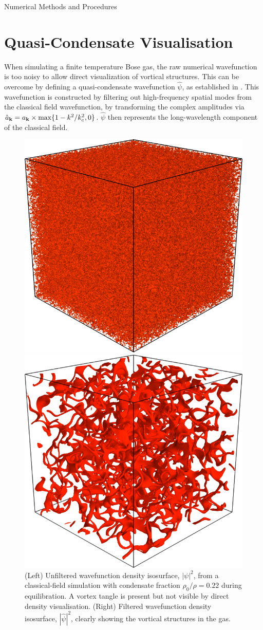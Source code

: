 \begin{chapter}{\label{cha:numerics}Numerical Methods and Procedures}
\section{\label{section:quasi-condensate} Quasi-Condensate Visualisation}
When simulating a finite temperature Bose gas, the raw numerical wavefunction is too noisy to allow direct visualization of vortical structures. This can be overcome by defining a quasi-condensate wavefunction $\hat{\psi}$, as established in \cite{PhysRevA.66.013603}. This wavefunction is constructed by filtering out high-frequency spatial modes from the classical field wavefunction, by 
transforming the complex amplitudes via
$\hat{a}_{{\bf k}} = a_{{\bf k}}\times\max\{1-k^{2}/k_c^2,0\}$. $\hat{\psi}$ then represents the long-wavelength component of the classical field.
\begin{figure}[!ht]
\centering
\includegraphics[width=0.35\linewidth]{numerics/figures/mess3d}%
    \begin{minipage}[b]{0.2\linewidth}
      \centering
      \raisebox{3cm}{$\longrightarrow$}
    \end{minipage}%
    \includegraphics[width=0.35\linewidth]{numerics/figures/clean3d}
  \caption{(Left) Unfiltered wavefunction density isosurface, $|\psi|^2$, from a classical-field simulation with condensate fraction $\rho_0/\rho=0.22$ during equilibration. A vortex tangle is present but not visible by direct density visualisation. (Right) Filtered wavefunction density isosurface, $|\hat{\psi}|^2$, clearly showing the vortical structures in the gas.}\label{fig:quasicondensatefilter}
  \end{figure}


\end{chapter}
